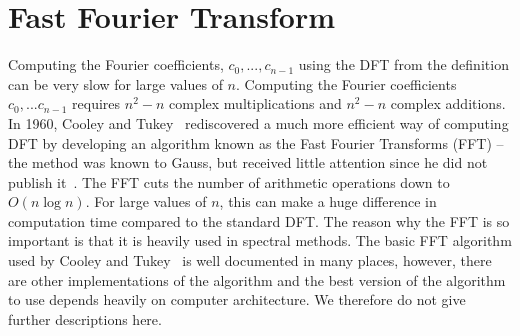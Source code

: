 \section{Fast Fourier Transform}
Computing the Fourier coefficients, $c_0,...,c_{n-1}$ using the DFT from the definition can be very slow for large values of $n$. Computing the Fourier coefficients $c_0,...c_{n-1}$ requires $n^2-n$ complex multiplications and $n^2-n$ complex additions. In 1960, Cooley and Tukey~\cite{CooTuk65} rediscovered a much more efficient way of computing DFT by developing an algorithm known as the Fast Fourier Transforms (FFT) -- the method was known to Gauss, but received little attention since he did not publish it~\cite{HeiJohBur84}. The FFT cuts the number of arithmetic operations down to $O(n\log n)$. For large values of $n$, this can make a huge difference in computation time compared to the standard DFT. The reason why the FFT is so important is that it is heavily used in spectral methods. The basic FFT algorithm used by Cooley and Tukey~\cite{CooTuk65} is well documented in many places, however, there are other implementations of the algorithm and the best version of the algorithm to use depends heavily on computer architecture. We therefore do not give further descriptions here.
